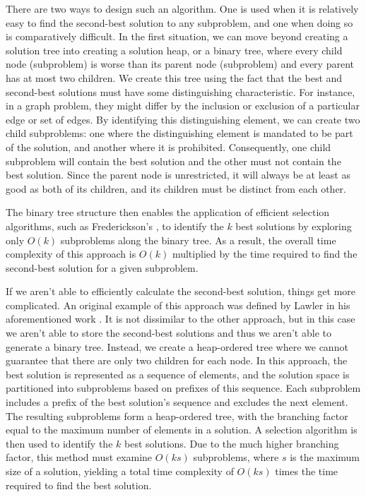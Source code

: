 There are two ways to design such an algorithm. One is used when it is relatively easy to find the second-best solution to any subproblem, and one when doing so is comparatively difficult. In the first situation, we can move beyond creating a solution tree into creating a solution heap, or a binary tree, where every child node (subproblem) is worse than its parent node (subproblem) and every parent has at most two children. We create this tree using the fact that the best and second-best solutions must have some distinguishing characteristic. For instance, in a graph problem, they might differ by the inclusion or exclusion of a particular edge or set of edges. By identifying this distinguishing element, we can create two child subproblems: one where the distinguishing element is mandated to be part of the solution, and another where it is prohibited. Consequently, one child subproblem will contain the best solution and the other must not contain the best solution. Since the parent node is unrestricted, it will always be at least as good as both of its children, and its children must be distinct from each other.

The binary tree structure then enables the application of efficient selection algorithms, such as Frederickson's \cite{frederickson1993optimal}, to identify the $k$ best solutions by exploring only $O(k)$ subproblems along the binary tree. As a result, the overall time complexity of this approach is $O(k)$ multiplied by the time required to find the second-best solution for a given subproblem.

If we aren't able to efficiently calculate the second-best solution, things get more complicated. An original example of this approach was defined by Lawler in his aforementioned work \cite{lawler1972procedure}. It is not dissimilar to the other approach, but in this case we aren't able to store the second-best solutions and thus we aren't able to generate a binary tree. Instead, we create a heap-ordered tree where we cannot guarantee that there are only two children for each node. In this approach, the best solution is represented as a sequence of elements, and the solution space is partitioned into subproblems based on prefixes of this sequence. Each subproblem includes a prefix of the best solution's sequence and excludes the next element. The resulting subproblems form a heap-ordered tree, with the branching factor equal to the maximum number of elements in a solution. A selection algorithm is then used to identify the $k$ best solutions. Due to the much higher branching factor, this method must examine $ O(ks) $ subproblems, where $s$ is the maximum size of a solution, yielding a total time complexity of $O(ks)$ times the time required to find the best solution.

